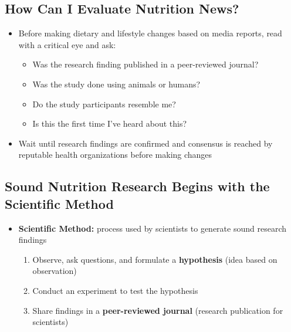 \documentclass[12pt]{article}
\begin{document}
        \subsection{How Can I Evaluate Nutrition News?}
            \begin{itemize}
                \item Before making dietary and lifestyle changes based on media reports, read with a critical eye and ask:
                    \begin{itemize}
                        \item Was the research finding published in a peer-reviewed journal?
                        \item Was the study done using animals or humans?
                        \item Do the study participants resemble me?
                        \item Is this the first time I've heard about this?
                    \end{itemize}
                \item Wait until research findings are confirmed and consensus is reached by reputable health organizations before making changes
            \end{itemize}

        \subsection{Sound Nutrition Research Begins with the Scientific Method}
            \begin{itemize}
                \item \textbf{Scientific Method:} process used by scientists to generate sound research findings
                    \begin{enumerate}
                        \item Observe, ask questions, and formulate a \textbf{hypothesis} (idea based on observation)
                        \item Conduct an experiment to test the hypothesis
                        \item Share findings in a \textbf{peer-reviewed journal} (research publication for scientists)
                    \end{enumerate}
            \end{itemize}
\end{document}
